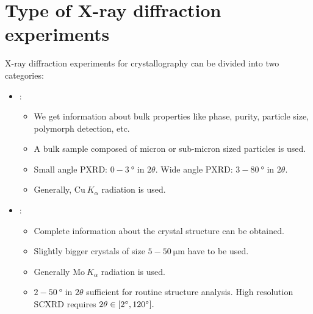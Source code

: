 \section{Type of X-ray diffraction experiments}

X-ray diffraction experiments for crystallography can be divided into two categories:%
%	
	\begin{itemize}%
%	
	    \item {}:%
%	    	
	    	\begin{itemize}[label={$\rightarrowtail$}]%
%	    	
	    	    \item We get information about bulk properties like phase, purity, particle size, polymorph detection, etc.
	    	    
	    	    \item A bulk sample composed of micron or sub-micron sized particles is used.
	    	    
	    	    \item Small angle PXRD: $0-3~\si{\degree}$ in $2\theta.$ Wide angle PXRD: $3-80~\si{\degree}$ in $2\theta.$
	    	    
	    	    \item Generally, $\mathrm{Cu}~K_\alpha$ radiation is used.
	    	    
	    	\end{itemize}
	    	
	    \item {}:%
%	    	
	    	\begin{itemize}[label={$\rightarrowtail$}]%
%	    	
	    	    \item Complete information about the crystal structure can be obtained.
	    	    
	    	    \item Slightly bigger crystals of size $5-50~\si{\micro\metre}$ have to be used.
	    	    
	    	    \item Generally $\mathrm{Mo}~K_\alpha$ radiation is used.
	    	    
	    	    \item $2-50~\si{\degree}$ in $2\theta$ sufficient for routine structure analysis. High resolution SCXRD requires $2\theta \in \qty[ \SI{2}{\degree}, \SI{120}{\degree} ].$
	    	    
	    	\end{itemize}
	    
	\end{itemize}